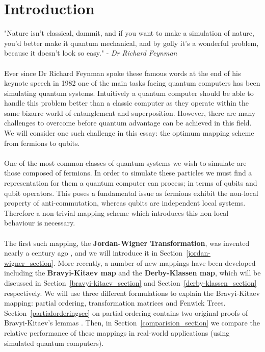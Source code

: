 \documentclass[twoside]{article}
\begin{document}
\section{Introduction}
"Nature isn't classical, dammit, and if you want to make a simulation of nature, you'd better make it quantum mechanical, and by golly it's a wonderful problem, because it doesn't look so easy." - \textsl{Dr Richard Feynman} \cite{feynmann}  \\\\
Ever since Dr Richard Feynman spoke these famous words at the end of his keynote speech in 1982 one of the main tasks facing quantum computers has been simulating quantum systems. Intuitively a quantum computer should be able to handle this problem better than a classic computer as they operate within the same bizarre world of entanglement and superposition. However, there are many challenges to overcome before quantum advantage can be achieved in this field. We will consider one such challenge in this essay: the optimum mapping scheme from fermions to qubits.\\\\
One of the most common classes of quantum systems we wish to simulate are those composed of fermions. In order to simulate these particles we must find a representation for them a quantum computer can process; in terms of qubits and qubit operators. This poses a fundamental issue as fermions exhibit the non-local property of anti-commutation, whereas qubits are independent local systems. Therefore a non-trivial mapping scheme which introduces this non-local behaviour is necessary.\\\\
The first such mapping, the \textbf{Jordan-Wigner Transformation}, was invented nearly a century ago \cite{originalJordanWigner}, and we will introduce it in Section~\ref{jordan-wigner_section}. More recently, a number of new mappings have been developed including the \textbf{Bravyi-Kitaev map} and the \textbf{Derby-Klassen map}, which will be discussed in Section~\ref{bravyi-kitaev_section} and Section~\ref{derby-klassen_section} respectively. We will use three different formulations to explain the Bravyi-Kitaev mapping: partial ordering, transformation matrices and Fenwick Trees. Section~\ref{partialorderingsec} on partial ordering contains two original proofs of Bravyi-Kitaev's lemmas \cite{bravyikitaev}. Then, in Section~\ref{comparision_section} we compare the relative performance of these mappings in real-world applications (using simulated quantum computers).
\end{document}
